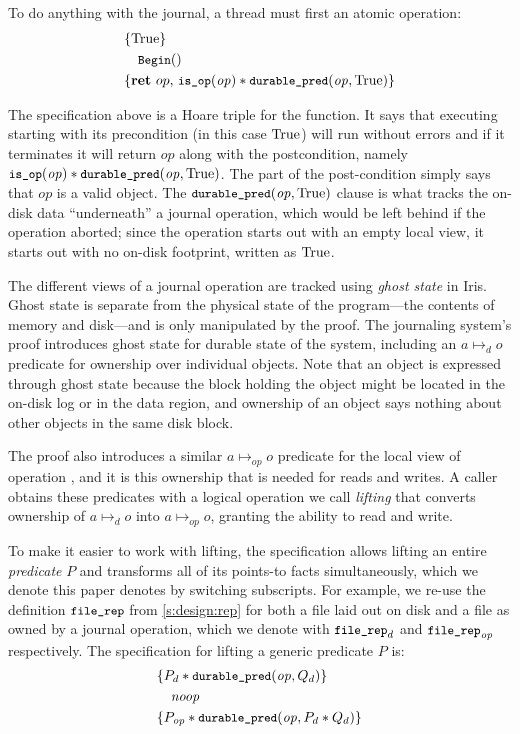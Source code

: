 To do anything with the journal, a thread must first  an atomic operation:
\hypertarget{tgt:begin-spec}{}
%
\begin{align*}
  \hoareV{\TRUE}{\cc{Begin}()}{\Ret{op}
    \cc{is_op}(\mathit{op}) \sep
    \bufobjDurable(\mathit{op}, \TRUE)}
\end{align*}

The specification above is a Hoare triple for the  function. It says
that executing  starting with its precondition (in this case $\mathrm{True}$) will run
without errors and if it terminates it will return $\mathit{op}$ along with the
postcondition, namely $\cc{is_op}(\mathit{op}) \sep \bufobjDurable(\mathit{op}, \TRUE)$.
The  part of the post-condition simply says that $\mathit{op}$ is a
valid  object. The $\bufobjDurable(\mathit{op}, \TRUE)$ clause is what tracks the
on-disk data ``underneath'' a journal operation, which would be left behind if the
operation aborted; since the operation starts out with an empty local view,
it starts out with no on-disk footprint, written as $\mathrm{True}$.


The different views of a journal operation are tracked using \emph{ghost state} in Iris.  Ghost state is separate from
the physical state of the program---the contents of memory and disk---and is
only manipulated by the proof. The journaling system's proof introduces ghost
state for durable state of the system, including an $a \mapsto_{d} o$ predicate
for ownership over individual objects. Note that an object is expressed through
ghost state because the block holding the object might be located in the on-disk
log or in the data region, and ownership of an object says nothing about other
objects in the same disk block.

The proof also introduces a similar $a \mapsto_{\mathit{op}} o$ predicate for the local
view of operation , and it is this ownership that is needed for reads and
writes. A caller obtains these predicates with a logical operation we call
\emph{lifting} that converts ownership of $a \mapsto_{d} o$ into $a \mapsto_{\mathit{op}} o$, granting the
ability to read and write.


To make it easier to work with lifting, the specification allows lifting an
entire \emph{predicate} $P$ and transforms all of its points-to facts
simultaneously, which we denote this paper denotes by switching subscripts. For
example, we re-use
the definition $\cc{file_rep}$ from \cref{s:design:rep} for both a file laid
out on disk and a file as owned by a journal operation, which we denote with
$\cc{file_rep}_{d}$ and $\cc{file_rep}_{\mathit{op}}$ respectively. The specification
for lifting a generic predicate $P$ is:
%
\begin{align*}
  \hoareV{P_d \sep \bufobjDurable(\mathit{op}, Q_d)}{\SKIP}{P_{\mathit{op}} \sep \bufobjDurable(\mathit{op}, P_d \sep Q_d)}
\end{align*}

